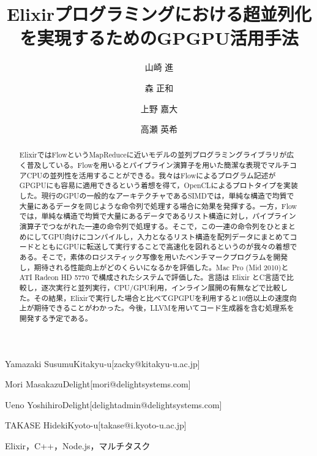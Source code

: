 \documentclass[submit,techrep]{ipsj}
\begin{document}
\title{Elixirプログラミングにおける超並列化を実現するためのGPGPU活用手法}



\author{山崎 進}{Yamazaki Susumu}{Kitakyu-u}[zacky@kitakyu-u.ac.jp]
\author{森 正和}{Mori Masakazu}{Delight}[mori@delightsystems.com]
\author{上野 嘉大}{Ueno Yoshihiro}{Delight}[delightadmin@delightsystems.com]
\author{高瀬 英希}{TAKASE Hideki}{Kyoto-u}[takase@i.kyoto-u.ac.jp]

\begin{abstract}
ElixirではFlowというMapReduceに近いモデルの並列プログラミングライブラリが広く普及している。Flowを用いるとパイプライン演算子を用いた簡潔な表現でマルチコアCPUの並列性を活用することができる。我々はFlowによるプログラム記述がGPGPUにも容易に適用できるという着想を得て，OpenCLによるプロトタイプを実装した。現行のGPUの一般的なアーキテクチャであるSIMDでは，単純な構造で均質で大量にあるデータを同じような命令列で処理する場合に効果を発揮する。一方，Flowでは，単純な構造で均質で大量にあるデータであるリスト構造に対し，パイプライン演算子でつながれた一連の命令列で処理する。そこで，この一連の命令列をひとまとめにしてGPU向けにコンパイルし，入力となるリスト構造を配列データにまとめてコードとともにGPUに転送して実行することで高速化を図れるというのが我々の着想である。そこで，素体のロジスティック写像を用いたベンチマークプログラムを開発し，期待される性能向上がどのくらいになるかを評価した。Mac Pro (Mid 2010)とATI Radeon HD 5770 で構成されたシステムで評価した。言語は Elixir とC言語で比較し，逐次実行と並列実行，CPU/GPU利用，インライン展開の有無などで比較した。その結果，Elixirで実行した場合と比べてGPGPUを利用すると10倍以上の速度向上が期待できることがわかった。今後，LLVMを用いてコード生成器を含む処理系を開発する予定である。
\end{abstract}


\begin{jkeyword}
Elixir，C++，Node.js，マルチタスク
\end{jkeyword}
\end{document}
